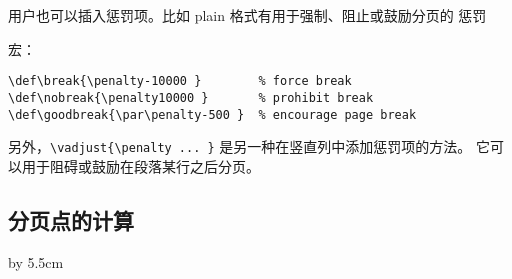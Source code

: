 \documentclass{book}
\begin{document}
用户也可以插入惩罚项。比如 plain 格式有用于强制、阻止或鼓励分页的%
\cstoidx 惩罚\par 宏：
\begin{verbatim}
\def\break{\penalty-10000 }        % force break
\def\nobreak{\penalty10000 }       % prohibit break
\def\goodbreak{\par\penalty-500 }  % encourage page break
\end{verbatim}
另外，\verb>\vadjust{\penalty ... }> 是另一种在竖直列中添加惩罚项的方法。
它可以用于阻碍或鼓励在段落某行之后分页。

\subsection{分页点的计算}

\advance\rightskip by 5.5cm
\end{document}

